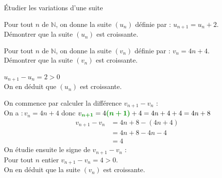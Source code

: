 \begin{methodeTitre}{Étudier les variations d'une suite}
\begin{enumMet}
\item Pour tout $n$ de $\mathbb{N}$, on donne la suite $\left(u_{n}\right)$ définie par : $u_{n+1}=u_{n}+2$.\\
Démontrer que la suite $\left(u_{n}\right)$ est croissante.
\item Pour tout $n$ de $\mathbb{N}$, on donne la suite $\left(v_{n}\right)$ définie par : $v_{n}=4 n+4$.\\
Démontrer que la suite $\left(v_{n}\right)$ est croissante.
\end{enumMet}
\begin{enumMet}
\item $u_{n+1}-u_{n}=2>0$\\
On en déduit que $\left(u_{n}\right)$ est croissante.
\item On commence par calculer la différence $v_{n+1}-v_{n}$ :\\
On a $: v_{n}=4 n+4$ donc $v_{\mVert{n+1}}=4\mVert{(n+1)}+4=4 n+4+4=4 n+8$
\begin{align*}
v_{n+1}-v_{n}&=4 n+8-(4 n+4) \\
&=4 n+8-4 n-4 \\
&=4
\end{align*}
On étudie ensuite le signe de $v_{n+1}-v_{n}$ :\\
Pour tout $n$ entier $v_{n+1}-v_{n}=4>0$.\\
On en déduit que la suite $\left(v_{n}\right)$ est croissante.
\end{enumMet}
\end{methodeTitre}

